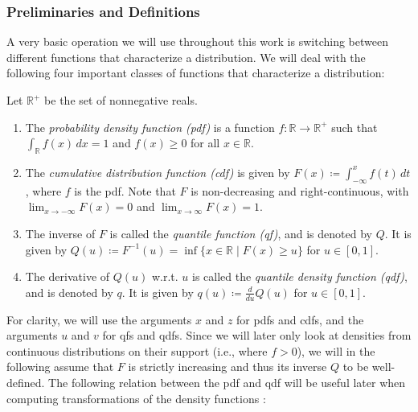 \subsubsection{Preliminaries and Definitions}
\label{sec:definitions}
A very basic operation we will use throughout this work is switching between different functions
that characterize a distribution. We will deal with the following four important classes
of functions that characterize a distribution:
\begin{definition}
    \label{def:distributionfuncs}
    Let \(\mathbb{R}^+\) be the set of nonnegative reals.
    \begin{enumerate}
        \item The \textit{probability density function (pdf)} is a function
        \( f: \mathbb{R} \to \mathbb{R}^+ \) such that \( \int_{\mathbb{R}} f(x) \, dx = 1 \)
        and \( f(x) \geq 0 \) for all \( x \in \mathbb{R} \).

        \item The \textit{cumulative distribution function (cdf)} is given by
        \( F(x) \coloneqq \int_{-\infty}^{x} f(t) \, dt \), where \( f \) is the pdf.
        Note that \( F\) is non-decreasing and right-continuous,
        with \( \lim_{{x \to -\infty}} F(x) = 0 \) and \( \lim_{{x \to \infty}} F(x) = 1 \).

        \item The inverse of \(F\) is called the \textit{quantile function (qf)},
        and is denoted by \(Q\). It is given by \( Q(u) \coloneqq F^{-1}(u) =
        \inf \{ x \in \mathbb{R} \mid F(x) \geq u \} \) for \( u \in [0, 1] \).

        \item The derivative of \(Q(u)\) w.r.t. \(u\) is called the \textit{quantile
        density function (qdf)}, and is denoted by \(q\). It is given by
        \(q(u) \coloneqq \frac{d}{du} Q(u)\) for \( u \in [0, 1] \).
    \end{enumerate}
\end{definition}
For clarity, we will use the arguments $x$ and $z$ for pdfs and cdfs, and the arguments
$u$ and $v$ for qfs and qdfs. Since we will later only look at densities from continuous
distributions on their support (i.e., where $f > 0$), we will in the following assume
that $F$ is strictly increasing and thus its inverse $Q$ to be well-defined.
The following relation between the pdf and qdf will be useful later when computing
transformations of the density functions \parencite[cf.][]{Jones1992}:
